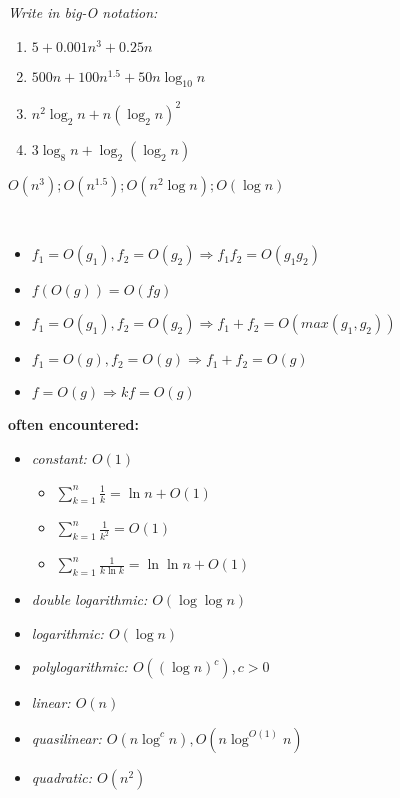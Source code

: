 \documentclass{article}
\begin{document}
\begin{exercises}
    \textit{Write in big-O notation:}
    \begin{enumerate}
        \item $5 + 0.001n^3 + 0.25n$
        \item $500n+100n^{1.5}+50n\log_{10} n$
        \item $n^2\log_{2} n+n(\log_{2} n)^2$
        \item $3\log_{8}n+\log_2(\log_2 n)$
    \end{enumerate}
    \begin{solution}
        $O(n^3);O(n^1.5);O(n^2\log n);O(\log n)$
    \end{solution}
\end{exercises}
\begin{prop}\
    \begin{itemize}
        \item $f_1 = O(g_1),f_2=O(g_2)\Rightarrow f_1f_2=O(g_1g_2)$
        \item $f(O(g))=O(fg)$
        \item $f_1 = O(g_1), f_2 = O(g_2) \Rightarrow f_1 + f_2 = O(max(g_1, g_2))$
        \item $f_1 = O(g), f_2 = O(g) \Rightarrow f_1 + f_2 = O(g)$
        \item $f = O(g)\Rightarrow kf = O(g)$
    \end{itemize}
    \textbf{\indent often encountered:}
    \begin{itemize}
        \item \textit{constant: $O(1)$}
        \begin{itemize}
            \item $\sum\limits_{k=1}^{n}\frac{1}{k} = \ln n+O(1)$
            \item $\sum\limits_{k=1}^{n}\frac{1}{k^2} = O(1)$
            \item $\sum\limits_{k=1}^{n}\frac{1}{k\ln k} = \ln \ln n + O(1)$
        \end{itemize}
        \item \textit{double logarithmic: $O(\log \log n)$}
        \item \textit{logarithmic: $O(\log n)$}
        \item \textit{polylogarithmic: $O((\log n)^c), c > 0$}
        \item \textit{linear: $O(n)$}
        \item \textit{quasilinear: $O(n\log ^c n),O(n\log^{O(1)}n)$}
        \item \textit{quadratic: $O(n^2)$}
    \end{itemize}
\end{prop}
\end{document}
